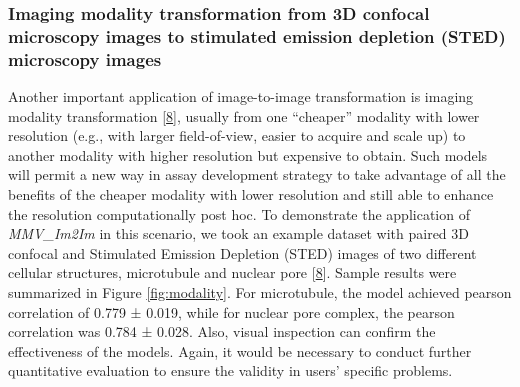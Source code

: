 \hypertarget{imaging-modality-transformation-from-3d-confocal-microscopy-images-to-stimulated-emission-depletion-sted-microscopy-images}{%
\subsubsection{Imaging modality transformation from 3D confocal microscopy images to stimulated emission depletion (STED) microscopy images}\label{imaging-modality-transformation-from-3d-confocal-microscopy-images-to-stimulated-emission-depletion-sted-microscopy-images}}

Another important application of image-to-image transformation is imaging modality transformation {[}\protect\hyperlink{ref-UEBDZ3tI}{8}{]}, usually from one ``cheaper'' modality with lower resolution (e.g., with larger field-of-view, easier to acquire and scale up) to another modality with higher resolution but expensive to obtain. Such models will permit a new way in assay development strategy to take advantage of all the benefits of the cheaper modality with lower resolution and still able to enhance the resolution computationally post hoc. To demonstrate the application of \emph{MMV\_Im2Im} in this scenario, we took an example dataset with paired 3D confocal and Stimulated Emission Depletion (STED) images of two different cellular structures, microtubule and nuclear pore {[}\protect\hyperlink{ref-UEBDZ3tI}{8}{]}. Sample results were summarized in Figure \ref{fig:modality}. For microtubule, the model achieved pearson correlation of 0.779 ± 0.019, while for nuclear pore complex, the pearson correlation was 0.784 ± 0.028. Also, visual inspection can confirm the effectiveness of the models. Again, it would be necessary to conduct further quantitative evaluation to ensure the validity in users' specific problems.

